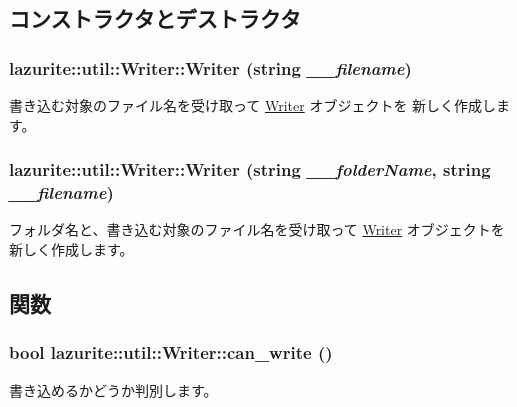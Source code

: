 \subsection{コンストラクタとデストラクタ}
\hypertarget{classlazurite_1_1util_1_1_writer_a0b9d88e8ee23a4012f73c06808f6d55d}{
\subsubsection[{Writer}]{\setlength{\rightskip}{0pt plus 5cm}lazurite::util::Writer::Writer (string {\em \_\-\_\-filename})}}
\label{classlazurite_1_1util_1_1_writer_a0b9d88e8ee23a4012f73c06808f6d55d}
書き込む対象のファイル名を受け取って \hyperlink{classlazurite_1_1util_1_1_writer}{Writer} オブジェクトを 新しく作成します。 \hypertarget{classlazurite_1_1util_1_1_writer_a67cd02f6bbf65a91f2613fcd54217254}{
\subsubsection[{Writer}]{\setlength{\rightskip}{0pt plus 5cm}lazurite::util::Writer::Writer (string {\em \_\-\_\-folderName}, \/  string {\em \_\-\_\-filename})}}
\label{classlazurite_1_1util_1_1_writer_a67cd02f6bbf65a91f2613fcd54217254}
フォルダ名と、書き込む対象のファイル名を受け取って \hyperlink{classlazurite_1_1util_1_1_writer}{Writer} オブジェクトを新しく作成します。 

\subsection{関数}
\hypertarget{classlazurite_1_1util_1_1_writer_a2bf9621aaa39def983069d70c09e5c6a}{
\subsubsection[{can\_\-write}]{\setlength{\rightskip}{0pt plus 5cm}bool lazurite::util::Writer::can\_\-write ()}}
\label{classlazurite_1_1util_1_1_writer_a2bf9621aaa39def983069d70c09e5c6a}
書き込めるかどうか判別します。 

